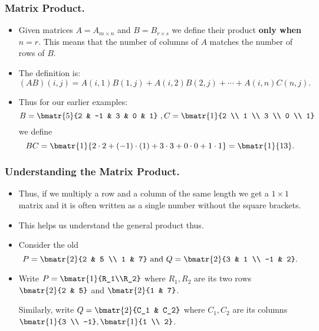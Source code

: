 
\begin{frame}%
  \frametitle{Matrix Product.}
  \begin{itemize}%
 
\item Given matrices $A=A_{m\times n}$ and $B=B_{r \times s}$ we define
their product {\bf only when } $n=r$. This means that the number of
columns of $A$ matches the number of rows of $B$.

\item The definition is:
$$(AB)(i,j) = A(i,1)B(1,j)+A(i,2)B(2,j)+\cdots +A(i,n)C(n,j).$$

\item Thus for our earlier examples:
$$ B=\bmatr{5}{2 & -1 & 3 & 0 & 1}~,
    C=\bmatr{1}{2 \\ 1 \\ 3 \\ 0 \\ 1}$$
we define
$$BC = \bmatr{1}{2 \cdot 2+ (-1)\cdot (1) + 3 \cdot 3 + 0 \cdot 0 + 1 \cdot 1 }
= \bmatr{1}{13}.$$

\end{itemize}
\end{frame}


\begin{frame}%
  \frametitle{Understanding the Matrix Product.}
  \begin{itemize}%
 
\item Thus, if we multiply a row and a column of the same length we get
a $1\times 1$ matrix and it is often written as a single number without
the square brackets.

\item This helps us understand the general product thus.

\item Consider the old 
$$P=\bmatr{2}{2 & 5 \\ 1 & 7} \mbox{ and }
Q = \bmatr{2}{3 & 1 \\ -1 & 2}.$$

\item Write $P = \bmatr{1}{R_1\\R_2}$ where $R_1,R_2$ are its two rows
$\bmatr{2}{2 & 5} $ and $\bmatr{2}{1 & 7}$.

Similarly, write $Q=\bmatr{2}{C_1 & C_2}$ where
$C_1,C_2$ are its columns $\bmatr{1}{3 \\ -1}, \bmatr{1}{1 \\ 2}$.

\end{itemize}
\end{frame}

